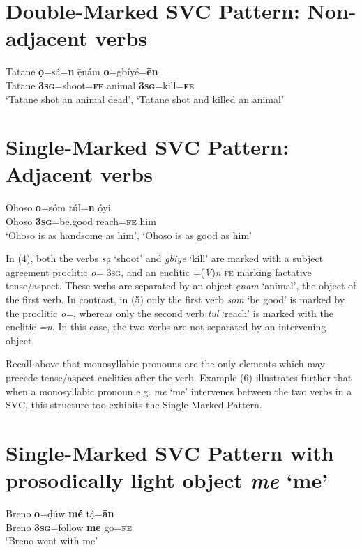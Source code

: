 \documentclass[output=paper]{langsci/langscibook}
\begin{document}
\chapter[Double{}-Marked SVC Pattern: Non{}-adjacent verbs]{Double-Marked SVC Pattern: Non-adjacent verbs}
\label{bkm:Ref448077718}\label{bkm:Ref419810719}\gll Tatane  \textbf{ọ}=sá=\textbf{n}      \={e}̣nám  \textbf{o}=gbíyé=\textbf{\={e}n}\\
     Tatane  \textbf{3}\textbf{\textsc{sg}}=shoot=\textbf{\textsc{fe}}  animal  \textbf{3}\textbf{\textsc{sg}}=kill=\textbf{\textsc{fe}}\\
\glt ‘Tatane shot an animal dead’, ‘Tatane shot and killed an animal’
\z

\chapter[Single{}-Marked SVC Pattern: Adjacent verbs]{Single-Marked SVC Pattern: Adjacent verbs}
\label{bkm:Ref419810724}\gll Ohoso   \textbf{o}=sóm       túl=\textbf{n}     ọ́yi\\
     Ohoso  \textbf{3}\textbf{\textsc{sg}}=be.good    reach=\textbf{\textsc{fe}}  him\\
\glt ‘Ohoso is as handsome as him’, ‘Ohoso is as good as him’
\z

In (4), both the verbs \textit{sạ} ‘shoot’ and \textit{gbiye }‘kill’ are marked with a subject agreement proclitic \textit{o=} \textsc{3sg}, and an enclitic =(\textit{V})\textit{n} \textsc{fe} marking factative tense/aspect. These verbs are separated by an object \textit{ẹnam} ‘animal’, the object of the first verb. In contrast, in (5) only the first verb \textit{som} ‘be good’ is marked by the proclitic \textit{o=}, whereas only the second verb \textit{tul} ‘reach’ is marked with the enclitic \textit{=n}. In this case, the two verbs are not separated by an intervening object. 

Recall above that monosyllabic pronouns are the only elements which may precede tense/aspect enclitics after the verb. Example (6) illustrates further that when a monosyllabic pronoun e.g. \textit{me} ‘me’ intervenes between the two verbs in a SVC, this structure too exhibits the Single-Marked Pattern. 

\chapter[Single{}-Marked SVC Pattern with prosodically light object me ‘me’]{Single-Marked SVC Pattern with prosodically light object \textit{me} ‘me’}
\label{bkm:Ref419897124}\gll Breno  \textbf{o}=ḍúw    \textbf{mé}  tạ́=\textbf{\={a}n}\\
     Breno   \textbf{3}\textbf{\textsc{sg}}=follow   \textbf{me}  go=\textbf{\textsc{fe}}\\
\glt ‘Breno went with me’ \citep[115]{Kari2004}
\z
\end{document}
